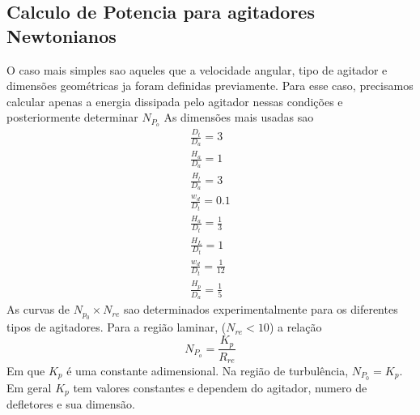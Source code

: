 \subsection{Calculo de Potencia para agitadores Newtonianos}
O caso mais simples sao aqueles que a velocidade angular, tipo de agitador e dimensões geométricas
ja foram definidas previamente. Para esse caso, precisamos calcular apenas a energia dissipada pelo
agitador nessas condições e posteriormente determinar \(N_{P_o}\) As dimensões mais usadas sao
\begin{equation}
    \begin{split}
        \frac{D_t}{D_a} = 3\\
        \frac{H_a}{D_a} = 1\\
        \frac{H_l}{D_a} = 3\\
        \frac{w_d}{D_t} = 0.1\\
        \frac{H_a}{D_t} = \frac{1}{3}\\
        \frac{H_L}{D_t} = 1\\
        \frac{w_d}{D_t} = \frac{1}{12}\\
        \frac{H_p}{D_a} = \frac{1}{5}
    \end{split}
\end{equation}
As curvas de \(N_{p_0} \times N_{re}\) sao determinados experimentalmente para os diferentes tipos
de agitadores. Para a região laminar, (\(N_{re} < 10\)) a relação
\begin{equation}
    N_{P_o} = \frac{K_p}{R_{re}}
\end{equation}
Em que \(K_p\) é uma constante adimensional. Na região de turbulência, \(N_{P_0} = K_p\). Em geral
\(K_p\) tem valores constantes e dependem do agitador, numero de defletores e sua dimensão.


